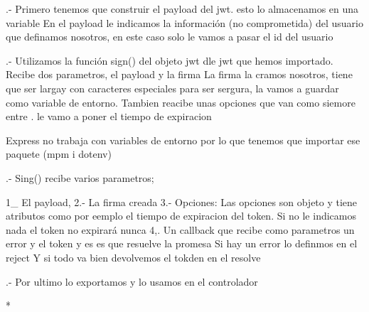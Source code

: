      .- Primero tenemos que construir el payload del jwt. esto lo almacenamos en una variable 
        En el payload le indicamos la información (no comprometida) del usuario que definamos nosotros, en este caso
        solo le vamos a pasar el id del usuario
    
      .- Utilizamos la función sign() del objeto jwt dle jwt que hemos importado. Recibe dos parametros, el payload y la firma
         La firma la cramos nosotros, tiene que ser largay  con caracteres especiales para ser sergura, la  vamos a guardar como
         variable de entorno. Tambien reacibe unas opciones que van como siemore entre {}. le vamo a poner el tiempo de expiracion
    
         Express no trabaja con variables de entorno por lo que tenemos que importar ese paquete  (mpm i dotenv)
    
    
       .- Sing() recibe varios parametros;
       
            1_  El payload, 
            2.- La firma creada
            3.- Opciones:
                    Las opciones son objeto y tiene atributos como por eemplo el tiempo de expiracion del token. 
                    Si no le indicamos nada el token no expirará nunca
            4,. Un callback que recibe como parametros un error y el token y es es que resuelve la promesa
                Si hay un error lo definmos en el reject
                Y si todo va bien devolvemos el tokden en el resolve
           
    
          
        .- Por ultimo lo exportamos y lo usamos en el controlador
    
    
    
    
    
    *
